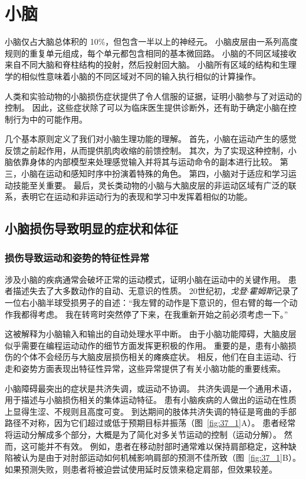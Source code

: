 \chapter{小脑} \label{chap:chap37}

小脑仅占大脑总体积的 10\%，但包含一半以上的神经元。
小脑皮层由一系列高度规则的重复单元组成，每个单元都包含相同的基本微回路。
小脑的不同区域接收来自不同大脑和脊柱结构的投射，然后投射回大脑。
小脑所有区域的结构和生理学的相似性意味着小脑的不同区域对不同的输入执行相似的计算操作。


人类和实验动物的小脑损伤症状提供了令人信服的证据，证明小脑参与了对运动的控制。
因此，这些症状除了可以为临床医生提供诊断外，还有助于确定小脑在控制行为中的可能作用。


几个基本原则定义了我们对小脑生理功能的理解。
首先，小脑在运动产生的感觉反馈之前起作用，从而提供肌肉收缩的前馈控制。
其次，为了实现这种控制，小脑依靠身体的内部模型来处理感觉输入并将其与运动命令的副本进行比较。
第三，小脑在运动和感知时序中扮演着特殊的角色。
第四，小脑对于适应和学习运动技能至关重要。
最后，灵长类动物的小脑与大脑皮层的非运动区域有广泛的联系，表明它在运动和非运动行为的表现和学习中发挥着相似的功能。



\section{小脑损伤导致明显的症状和体征}

\subsection{损伤导致运动和姿势的特征性异常}

涉及小脑的疾病通常会破坏正常的运动模式，证明小脑在运动中的关键作用。
患者描述失去了大多数动作的自动、无意识的性质。
20世纪初，\textit{戈登$\cdot$霍姆斯}记录了一位右小脑半球受损男子的自述：“我左臂的动作是下意识的，但右臂的每一个动作我都得考虑。
我在转弯时突然停了下来，在我重新开始之前必须考虑一下。”


这被解释为小脑输入和输出的自动处理水平中断。
由于小脑功能障碍，大脑皮层似乎需要在编程运动动作的细节方面发挥更积极的作用。
重要的是，患有小脑损伤的个体不会经历与大脑皮层损伤相关的瘫痪症状。
相反，他们在自主运动、行走和姿势方面表现出特征性异常，这些异常提供了有关小脑功能的重要线索。


小脑障碍最突出的症状是共济失调，或运动不协调。
共济失调是一个通用术语，用于描述与小脑损伤相关的集体运动特征。
患有小脑疾病的人做出的运动在性质上显得生涩、不规则且高度可变。 
到达期间的肢体共济失调的特征是弯曲的手部路径不对称，因为它们超过或低于预期目标并振荡（图~\ref{fig:37_1}A）。
患者经常将运动分解成多个部分，大概是为了简化对多关节运动的控制（运动分解）。
然而，这可能并不有效。
例如，患者在移动肘部时通常难以保持肩部稳定，这种缺陷被认为是由于对肘部运动如何机械影响肩部的预测不佳所致（图~\ref{fig:37_1}B）。
如果预测失败，则患者将被迫尝试使用延时反馈来稳定肩部，但效果较差。


